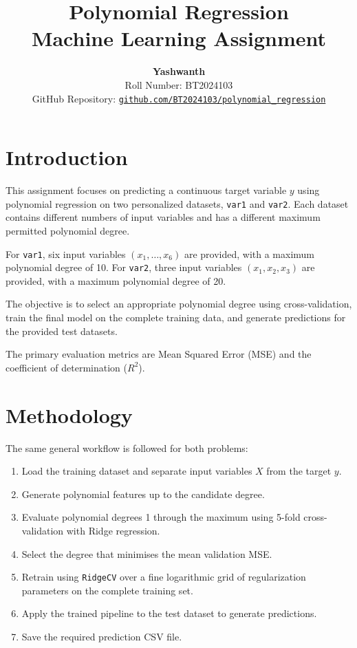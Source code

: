 \documentclass[10.5pt,a4paper]{article}
\title{
    \vspace{-1cm}
    \textbf{Polynomial Regression}\\
    \large Machine Learning Assignment
}
\author{
    \textbf{Yashwanth}\\
    Roll Number: BT2024103\\
    GitHub Repository:
    \href{https://github.com/BT2024103/polynomial_regression/}
    {\texttt{github.com/BT2024103/polynomial\_regression}}
}
\date{}
\begin{document}
\maketitle

\section{Introduction}

This assignment focuses on predicting a continuous target variable $y$
using polynomial regression on two personalized datasets, \texttt{var1}
and \texttt{var2}. Each dataset contains different numbers of input
variables and has a different maximum permitted polynomial degree.

For \texttt{var1}, six input variables $(x_1,\ldots,x_6)$ are provided,
with a maximum polynomial degree of 10. For \texttt{var2}, three input
variables $(x_1,x_2,x_3)$ are provided, with a maximum polynomial degree
of 20.

The objective is to select an appropriate polynomial degree using
cross-validation, train the final model on the complete training data,
and generate predictions for the provided test datasets.

The primary evaluation metrics are Mean Squared Error (MSE) and the
coefficient of determination ($R^2$).

\section{Methodology}

The same general workflow is followed for both problems:

\begin{enumerate}
    \item Load the training dataset and separate input variables $X$
    from the target $y$.
    \item Generate polynomial features up to the candidate degree.
    \item Evaluate polynomial degrees 1 through the maximum using
    5-fold cross-validation with Ridge regression.
    \item Select the degree that minimises the mean validation MSE.
    \item Retrain using \texttt{RidgeCV} over a fine logarithmic grid
    of regularization parameters on the complete training set.
    \item Apply the trained pipeline to the test dataset to generate
    predictions.
    \item Save the required prediction CSV file.
\end{enumerate}
\end{document}
